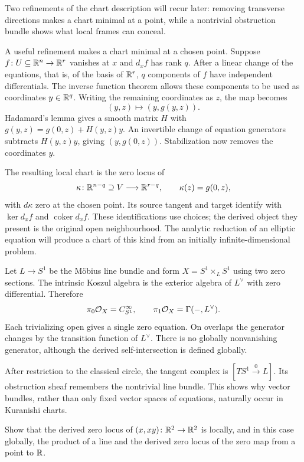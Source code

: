 Two refinements of the chart description will recur later: removing
transverse directions makes a chart minimal at a point, while a
nontrivial obstruction bundle shows what local frames can conceal.

A useful refinement makes a chart minimal at a chosen point.
Suppose $f\colon U\subseteq\mathbb{R}^n\to\mathbb{R}^r$ vanishes at $x$ and $d_xf$
has rank $q$. After a linear change of the equations, that is, of the
basis of $\mathbb{R}^r$, $q$ components of $f$ have independent differentials. The inverse function theorem
allows these components to be used as coordinates $y\in\mathbb{R}^q$.
Writing the remaining coordinates as $z$, the map becomes
\[
 (y,z)\longmapsto(y,g(y,z)).
\]
Hadamard's lemma gives a smooth matrix $H$ with
$g(y,z)=g(0,z)+H(y,z)y$.
An invertible change of equation generators subtracts $H(y,z)y$,
giving $(y,g(0,z))$. Stabilization now removes the coordinates $y$.

The resulting local chart is the zero locus of
\[
 \kappa\colon\mathbb{R}^{n-q}\supseteq V\longrightarrow\mathbb{R}^{r-q},
 \qquad\kappa(z)=g(0,z),
\]
with $d\kappa$ zero at the chosen point.
Its source tangent and target identify with
$\ker d_xf$ and $\operatorname{coker}d_xf$.
These identifications use choices; the derived object they present is
the original open neighbourhood. The analytic reduction of an elliptic
equation will produce a chart of this kind from an initially
infinite-dimensional problem.

\begin{example}
Let $L\to S^1$ be the M\"obius line bundle and form
$X=S^1\times_L S^1$ using two zero sections.
The intrinsic Koszul algebra is the exterior algebra of $L^\vee$
with zero differential. Therefore
\[
 \pi_0\mathcal O_X=C^\infty_{S^1},\qquad
 \pi_1\mathcal O_X=\Gamma(-,L^\vee).
\]
Each trivializing open gives a single zero equation. On overlaps the
generator changes by the transition function of $L^\vee$.
There is no globally nonvanishing generator, although the derived
self-intersection is defined globally.

After restriction to the classical circle, the tangent complex is
$[TS^1\xrightarrow0 L]$. Its obstruction sheaf remembers the
nontrivial line bundle. This shows why vector bundles, rather than only
fixed vector spaces of equations, naturally occur in Kuranishi charts.
\end{example}

\begin{exercise}
Show that the derived zero locus of $(x,xy)\colon\mathbb{R}^2\to\mathbb{R}^2$
is locally, and in this case globally, the product of a line and
the derived zero locus of the zero map from a point to $\mathbb{R}$.
\end{exercise}

